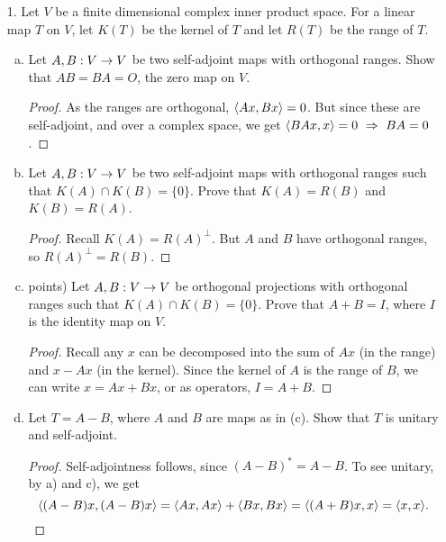
\begin{itemize}

\item[1.] Let $V$ be a finite dimensional complex inner product space. For a linear map $T$ on $V$, let $K(T)$ be the kernel of $T$ and let $R(T)$ be the range of $T$.
\begin{enumerate}[(a)]
\item Let $A, B : V \rightarrow V$ be two self-adjoint maps with orthogonal ranges.
Show that $AB = BA = O$, the zero map on $V$.
\begin{proof}
    As the ranges are orthogonal, $\langle{}Ax,Bx\rangle =0$. But since these are self-adjoint, and over a complex space, we get $\langle{}BAx,x\rangle=0 \ \Rightarrow \ BA=0$.
\end{proof}

\item Let $A, B : V \rightarrow V$ be two self-adjoint maps with orthogonal ranges
such that $K(A) \cap K(B) = \{0\}$. Prove that $K(A) = R(B)$ and $K(B) = R(A)$.
\begin{proof}
    Recall $K(A) = R(A)^{\perp}$. But $A$ and $B$ have orthogonal ranges, so $R(A)^{\perp} = R(B)$.
\end{proof}

\item points) Let $A, B : V \rightarrow V$ be orthogonal projections with orthogonal ranges
such that $K(A) \cap K(B) = \{0\}$. Prove that $A + B = I$, where $I$ is the identity
map on $V$.
\begin{proof}
    Recall any $x$ can be decomposed into the sum of $Ax$ (in the range) and $x-Ax$ (in the kernel). Since the kernel of $A$ is the range of $B$, we can write $x = Ax + Bx$, or as operators, $I = A+B$.
\end{proof}

\item Let $T = A - B$, where $A$ and $B$ are maps as in (c). Show that $T$
is unitary and self-adjoint.
\begin{proof}
    Self-adjointness follows, since $(A-B)^* = A-B$. To see unitary, by a) and c), we get $$\langle{}(A-B)x,(A-B)x\rangle = \langle{}Ax,Ax\rangle + \langle{}Bx,Bx\rangle = \langle{}(A+B)x,x\rangle = \langle{}x,x\rangle.$$
\end{proof}


\end{enumerate}
\end{itemize}
